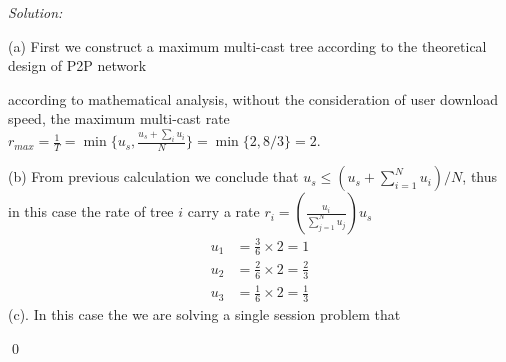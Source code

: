 \documentclass[12pt]{article}
\newenvironment{sol}
    {\emph{Solution:}
    }
    {
    \qed
    }
\begin{document}
\begin{sol}
	(a) First we construct a maximum multi-cast tree according to the theoretical design of P2P network
	\begin{figure}[H]
		\centering
	\end{figure}
	according to mathematical analysis, without the consideration of user download speed, the maximum multi-cast rate $ r_{max} = \frac{1}{T} = \min\{u_s, \frac{u_s + \sum_i u_i}{N}\} = \min\{2, 8/3\} = 2$. \par
	(b) From previous calculation we conclude that $u_s \leq (u_s + \sum_{i=1}^Nu_i)/N$, thus in this case the rate of tree $i$ carry a rate $r_i = (\frac{u_i}{\sum_{j=1}^Nu_j})u_s$
	\begin{align*}
		u_1 &= \frac{3}{6} \times 2 = 1 \\
		u_2 &= \frac{2}{6} \times 2 = \frac{2}{3} \\
		u_3 &= \frac{1}{6} \times 2 = \frac{1}{3}
	\end{align*}
	(c). In this case the we are solving a single session problem that

\end{sol}
\end{document}
